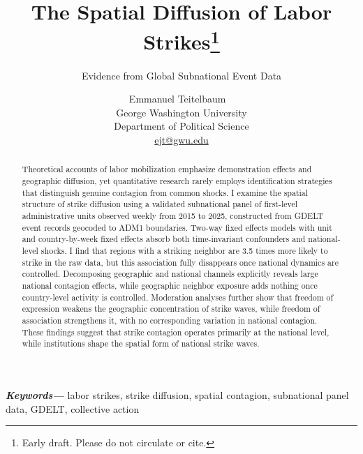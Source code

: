 \documentclass[
  11pt,
]{article}
\title{The Spatial Diffusion of Labor Strikes\thanks{Early draft. Please
do not circulate or cite.}}
\subtitle{Evidence from Global Subnational Event Data}
\author{Emmanuel Teitelbaum
~\orcidlink{0000-0001-7089-0588}
\\George Washington University
\\Department of Political Science
\\\href{mailto:ejt@gwu.edu}{ejt@gwu.edu}
 }
\date{}  %
\providecommand{\keywords}[1]{\textbf{\textit{Keywords---}}#1}
\newcommand{\published}[1]{%
   \gdef\puB{#1}}
\newcommand{\puB}{}
\begin{document}


\published{\textbf{2026-03-20} \qquad Prepared for the APSA Labor
Group's Comparative Politics Workshop. \\ {\scriptsize Access the code,
data, and analysis at
\url{https://github.com/eteitelbaum/gdelt-strikes.git}}}

\vspace{0.25in}

\maketitle

\vspace{0.25in}


\begin{abstract}
\noindent            %
Theoretical accounts of labor mobilization emphasize demonstration
effects and geographic diffusion, yet quantitative research rarely
employs identification strategies that distinguish genuine contagion
from common shocks. I examine the spatial structure of strike diffusion
using a validated subnational panel of first-level administrative units
observed weekly from 2015 to 2025, constructed from GDELT event records
geocoded to ADM1 boundaries. Two-way fixed effects models with unit and
country-by-week fixed effects absorb both time-invariant confounders and
national-level shocks. I find that regions with a striking neighbor are
3.5 times more likely to strike in the raw data, but this association
fully disappears once national dynamics are controlled. Decomposing
geographic and national channels explicitly reveals large national
contagion effects, while geographic neighbor exposure adds nothing once
country-level activity is controlled. Moderation analyses further show
that freedom of expression weakens the geographic concentration of
strike waves, while freedom of association strengthens it, with no
corresponding variation in national contagion. These findings suggest
that strike contagion operates primarily at the national level, while
institutions shape the spatial form of national strike waves.
\end{abstract}

\vspace{\baselineskip}

\noindent \keywords{%
labor strikes, strike diffusion, spatial contagion, subnational panel
data, GDELT, collective action%
}
\end{document}
